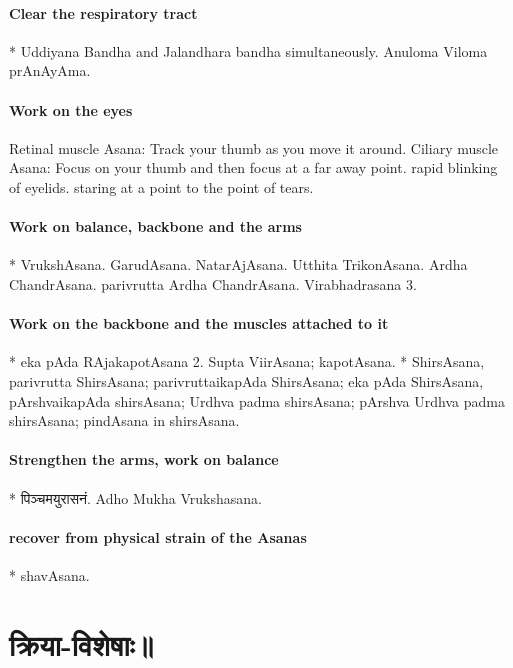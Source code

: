 \documentclass[oneside, article]{memoir}
\begin{document}
\subsection{Clear the respiratory tract}

    * Uddiyana Bandha and Jalandhara bandha simultaneously. Anuloma Viloma prAnAyAma.

\subsection{Work on the eyes}

Retinal muscle Asana: Track your thumb as you move it around. Ciliary muscle Asana: Focus on your thumb and then focus at a far away point. rapid blinking of eyelids. staring at a point to the point of tears.

\subsection{Work on balance, backbone and the arms}

    * VrukshAsana. GarudAsana. NatarAjAsana. Utthita TrikonAsana. Ardha ChandrAsana. parivrutta Ardha ChandrAsana. Virabhadrasana 3.

\subsection{Work on the backbone and the muscles attached to it}

    * eka pAda RAjakapotAsana 2. Supta ViirAsana; kapotAsana. 
    * ShirsAsana, parivrutta ShirsAsana; parivruttaikapAda ShirsAsana; eka pAda ShirsAsana, pArshvaikapAda shirsAsana; Urdhva padma shirsAsana; pArshva Urdhva padma shirsAsana; pindAsana in shirsAsana.

\subsection{Strengthen the arms, work on balance}

    * पिञ्चमयुरासनं. Adho Mukha Vrukshasana.

\subsection{recover from physical strain of the Asanas}

    * shavAsana.


\part{क्रिया-विशेषाः॥}
\end{document}
